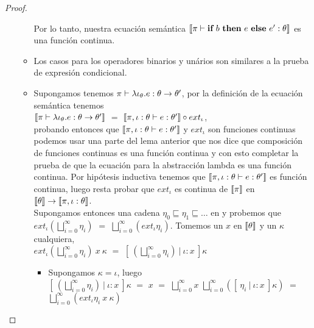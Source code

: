 \begin{proof}
\begin{itemize}
\begin{itemize}
Por lo tanto, nuestra ecuaci\'on sem\'antica $\llbracket \pi \vdash \textbf{if} \ b \ \textbf{then} \ e \ \textbf{else} \ e' : \theta \rrbracket$ es
una funci\'on continua.

\item Los casos para los operadores binarios y un\'arios son similares a la prueba
de expresi\'on condicional.

\item Supongamos tenemos $\pi \vdash \lambda \iota_{\theta} . e : \theta \rightarrow \theta'$, 
por la definici\'on de la ecuaci\'on sem\'antica tenemos \\

$\llbracket \pi \vdash \lambda \iota_{\theta} . e : \theta \rightarrow \theta' \rrbracket$ $=$
$\llbracket \pi,\iota:\theta \vdash e : \theta' \rrbracket \circ ext_\iota$, \\

probando entonces
que $\llbracket \pi,\iota:\theta \vdash e : \theta' \rrbracket$ y $ext_\iota$ son funciones 
continuas podemos usar una parte del lema anterior que nos dice que composici\'on
de funciones continuas es una funci\'on continua y con esto completar la prueba de que
la ecuaci\'on para la abstracci\'on lambda es una funci\'on continua. Por hip\'otesis
inductiva tenemos que $\llbracket \pi,\iota:\theta \vdash e : \theta' \rrbracket$ es funci\'on
continua, luego resta probar que $ext_\iota$ es continua de $\llbracket \pi \rrbracket$ en 
$\llbracket \theta \rrbracket \rightarrow \llbracket \pi,\iota:\theta \rrbracket$.\\

Supongamos entonces una cadena $\eta_0 \sqsubseteq \eta_1 \sqsubseteq \ldots$ en 
y probemos que $ext_\iota (\bigsqcup\limits^{\infty}_{i=0} \eta_i)$ $=$
$\bigsqcup\limits^{\infty}_{i=0} (ext_\iota \eta_i)$. Tomemos un $x$ en $\llbracket \theta \rrbracket$
y un $\kappa$ cualquiera,\\

$ext_\iota (\bigsqcup\limits^{\infty}_{i=0} \eta_i) \ x \ \kappa$ $=$
$[ \ (\bigsqcup\limits^{\infty}_{i=0} \eta_i) \ | \ \iota:x \ ] \kappa$

\begin{itemize}
\item Supongamos $\kappa = \iota$, luego \\

$[ \ (\bigsqcup\limits^{\infty}_{i=0} \eta_i) \ | \ \iota:x \ ] \kappa$ $=$
$x$ $=$ $\bigsqcup\limits^{\infty}_{i=0} x$ $\bigsqcup\limits^{\infty}_{i=0} 
([ \ \eta_i \ | \ \iota:x \ ] \kappa)$ $=$ $\bigsqcup\limits^{\infty}_{i=0} (ext_\iota \eta_i \ x \ \kappa)$\\


\end{itemize}
\end{itemize}
\end{itemize}
\end{proof}
